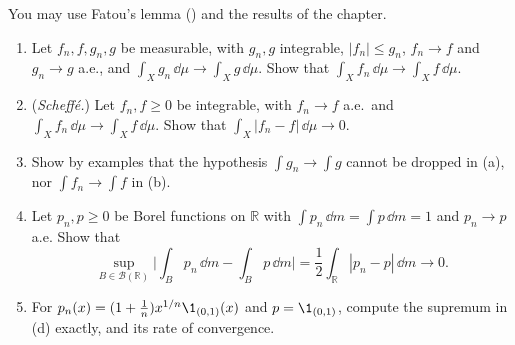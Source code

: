 \begin{exercise}\label{ex:ig-generalized-dct}
\hard You may use Fatou's lemma () and the results of the chapter.
\begin{enumerate}[label=(\alph*)]
  \item Let $f_n,f,g_n,g$ be measurable, with $g_n,g$ integrable, $|f_n|\le g_n$, $f_n\to f$ and
    $g_n\to g$ a.e., and $\int_Xg_n\,\dd\mu\to\int_Xg\,\dd\mu$. Show that
    $\int_Xf_n\,\dd\mu\to\int_Xf\,\dd\mu$.
  \item (\emph{Scheff\'e.}) Let $f_n,f\ge0$ be integrable, with $f_n\to f$ a.e.\ and
    $\int_Xf_n\,\dd\mu\to\int_Xf\,\dd\mu$. Show that $\int_X|f_n-f|\,\dd\mu\to0$.
  \item Show by examples that the hypothesis $\int g_n\to\int g$ cannot be dropped in (a), nor
    $\int f_n\to\int f$ in (b).
  \item Let $p_n,p\ge0$ be Borel functions on $\mathbb R$ with
    $\int p_n\,\dd m=\int p\,\dd m=1$ and $p_n\to p$ a.e. Show that
    \[
      \sup_{B\in\mathcal B(\mathbb R)}\Big|\int_Bp_n\,\dd m-\int_Bp\,\dd m\Big|
      =\frac12\int_{\mathbb R}|p_n-p|\,\dd m\longrightarrow0 .
    \]
  \item For $p_n(x)=(1+\frac1n)x^{1/n}\1_{(0,1)}(x)$ and $p=\1_{(0,1)}$, compute the supremum in
    (d) exactly, and its rate of convergence.
\end{enumerate}
\end{exercise}

